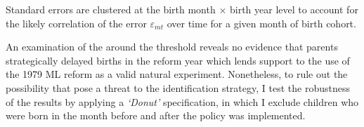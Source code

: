 
Standard errors are clustered at the birth month $\times$ birth year level to account for the likely correlation of the error $\varepsilon_{mt}$ over time for a given month of birth cohort.


\label{rev_mlch: editor_selective_delivery}
 An examination of the  around the threshold reveals no evidence that parents strategically delayed births in the reform year which lends support to the use of the 1979 ML reform as a valid natural experiment. Nonetheless, to rule out the possibility that  pose a threat to the identification strategy, I test the robustness of the results by applying a \textit{`Donut'} specification, in which I exclude children who were born in the month before and after the policy was implemented.
 


	














